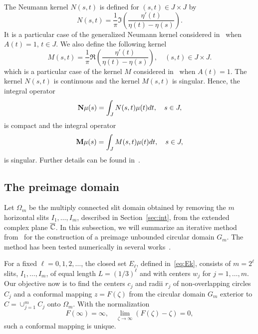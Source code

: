The Neumann kernel $N(s,t)$ is defined for $(s,t)\in J\times J$ by
\begin{equation}\label{eq:N}
N(s,t) =
\frac{1}{\pi}\Im\left(\frac{\eta'(t)}{\eta(t)-\eta(s)}\right).
\end{equation}
It is a particular case of the generalized Neumann kernel considered in~\cite{Weg-Nas} when $A(t)=1$, $t\in J$.
We also define the following kernel 
\begin{equation}\label{eq:M}
M(s,t) =
\frac{1}{\pi}\Re\left(\frac{\eta'(t)}{\eta(t)-\eta(s)}\right), \quad (s,t)\in J\times J.
\end{equation}
which is a particular case of the kernel $M$ considered in~\cite{Weg-Nas} when $A(t)=1$.
The kernel $N(s,t)$ is continuous and the kernel $M(s,t)$ is singular.
Hence, the integral operator 
\[
{\bf N}\mu(s) = \int_J N(s,t) \mu(t) dt, \quad s\in J,
\]
is compact and the integral operator 
\[
{\bf M}\mu(s) = \int_J  M(s,t) \mu(t) dt, \quad s\in J,
\]
is singular. Further details can be found in~\cite{Weg-Nas}.


\subsection{The preimage domain}\label{sec:pre}

Let $\Omega_m$ be the multiply connected slit domain obtained by removing the $m$ horizontal slits $I_1,\ldots,I_m$, described in Section~\ref{sec:int}, from the extended complex plane $\overline{{\mathbb C}}$. In this subsection, we will summarize  an iterative method from~\cite{AST13,NG18} for the construction of a preimage unbounded circular domain $G_m$. The method has been tested numerically in several works~\cite{LSN17,NK,Nvm}.

For a fixed $\ell=0,1,2,\ldots$, the closed set $E_\ell$, defined in~\eqref{eq:Ek}, consists of $m=2^\ell$ slits, $I_1,\ldots,I_m$, of equal length $L=(1/3)^\ell$ and with centers $w_j$ for $j=1,\ldots,m$. Our objective now is to find the centers $c_j$ and radii $r_j$ of non-overlapping circles $C_j$ and a conformal mapping $z=F(\zeta)$ from the circular domain $G_m$ exterior to $C=\cup_{j=1}^m C_j$ onto $\Omega_m$. With the normalization
\[
F(\infty)=\infty, \quad \lim_{\zeta\to\infty}(F(\zeta)-\zeta)=0,
\]
such a conformal mapping is unique.

